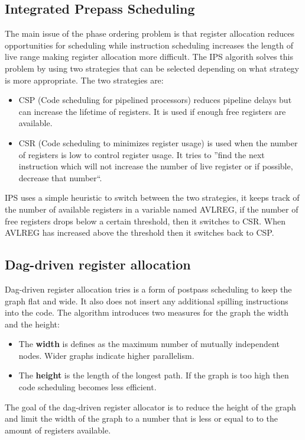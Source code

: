 \documentclass[a4paper,10pt]{article}
\begin{document}
\subsection{Integrated Prepass Scheduling}
The main issue of the phase ordering problem is that register allocation reduces opportunities for scheduling while instruction scheduling 
increases the length of live range making register allocation more difficult. The IPS algorith solves this problem by using two strategies 
that can be selected depending on what strategy is more appropriate. The two strategies are:
\begin{itemize}
 \item CSP (Code scheduling for pipelined processors) reduces pipeline delays but can increase the lifetime of registers. It is used if 
       enough free registers are available.
 \item CSR (Code scheduling to minimizes register usage) is used when the number of registers is low to control register usage. It tries
to ''find the next instruction which will not increase the number of live register or if possible, decrease that number``.
\end{itemize}
IPS uses a simple heuristic to switch between the two strategies, it keeps track of the number of available registers in a variable named 
AVLREG, if the number of free registers drops below a certain threshold, then it switches to CSR. When AVLREG has increased above the 
threshold then it switches back to CSP.

\subsection{Dag-driven register allocation}
Dag-driven register allocation tries is a form of postpass scheduling to keep the graph flat and wide. It also does not insert any 
additional spilling instructions into the code. The algorithm introduces two measures for the graph the width and the height:
\begin{itemize}
 \item The \textbf{width} is defines as the maximum number of mutually independent nodes. Wider graphs indicate higher parallelism.
 \item The \textbf{height} is the length of the longest path. If the graph is too high then code scheduling becomes less efficient.
\end{itemize}
The goal of the dag-driven register allocator is to reduce the height of the graph and limit the width of the graph to a number that is less or equal to to the amount of registers available.
\end{document}

